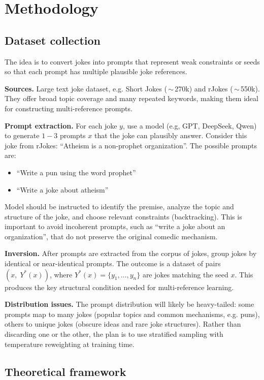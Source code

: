 \documentclass[12pt]{extarticle}
\begin{document}
\section{Methodology}

\subsection{Dataset collection}
The idea is to convert jokes into prompts that represent weak constraints or seeds so that each prompt has multiple plausible joke references.

\textbf{Sources.} Large text joke dataset, e.g. Short Jokes (\,\(\sim\)\,270k) and rJokes (\,\(\sim\)\,550k). They offer broad topic coverage and many repeated keywords, making them ideal for constructing multi-reference prompts.

\textbf{Prompt extraction.} For each joke \(y\), use a model (e.g, GPT, DeepSeek, Qwen) to generate \(1\!-\!3\) prompts \(x\) that the joke can plausibly answer. Consider this joke from rJokes: ``Atheism is a non-prophet organization''. The possible prompts are:
\begin{itemize}[leftmargin=1.5em]
  \item ``Write a pun using the word prophet''
  \item ``Write a joke about atheism''
\end{itemize}
Model should be instructed to identify the premise, analyze the topic and structure of the joke, and choose relevant constraints (backtracking). This is important to avoid incoherent prompts, such as ``write a joke about an organization'', that do not preserve the original comedic mechanism.

\textbf{Inversion.} After prompts are extracted from the corpus of jokes, group jokes by identical or near-identical prompts. The outcome is a dataset of pairs \( (x,\; Y^{*}(x)) \), where \( Y^{*}(x)=\{y_1,\dots,y_n\} \) are jokes matching the seed \( x \). This produces the key structural condition needed for multi-reference learning.

\textbf{Distribution issues.} The prompt distribution will likely be heavy-tailed: some prompts map to many jokes (popular topics and common mechanisms, e.g. puns), others to unique jokes (obscure ideas and rare joke structures). Rather than discarding one or the other, the plan is to use stratified sampling with temperature reweighting at training time.

\subsection{Theoretical framework}
\end{document}
